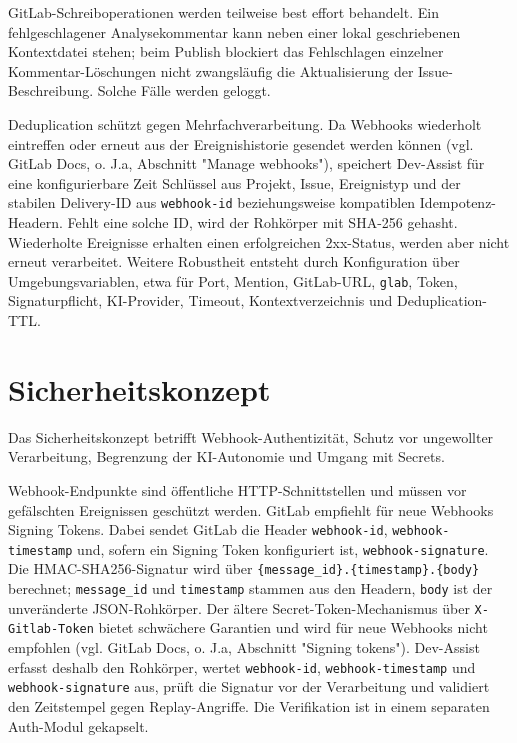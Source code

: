 \documentclass[12pt,a4paper,oneside]{scrreprt}
\begin{document}
GitLab-Schreiboperationen werden teilweise best effort behandelt. Ein fehlgeschlagener Analysekommentar kann neben einer lokal geschriebenen Kontextdatei stehen; beim Publish blockiert das Fehlschlagen einzelner Kommentar-Löschungen nicht zwangsläufig die Aktualisierung der Issue-Beschreibung. Solche Fälle werden geloggt.

Deduplication schützt gegen Mehrfachverarbeitung. Da Webhooks wiederholt eintreffen oder erneut aus der Ereignishistorie gesendet werden können (vgl. GitLab Docs, o. J.a, Abschnitt "Manage webhooks"), speichert Dev-Assist für eine konfigurierbare Zeit Schlüssel aus Projekt, Issue, Ereignistyp und der stabilen Delivery-ID aus \texttt{webhook-id} beziehungsweise kompatiblen Idempotenz-Headern. Fehlt eine solche ID, wird der Rohkörper mit SHA-256 gehasht. Wiederholte Ereignisse erhalten einen erfolgreichen 2xx-Status, werden aber nicht erneut verarbeitet. Weitere Robustheit entsteht durch Konfiguration über Umgebungsvariablen, etwa für Port, Mention, GitLab-URL, \texttt{glab}, Token, Signaturpflicht, KI-Provider, Timeout, Kontextverzeichnis und Deduplication-TTL.

\section{Sicherheitskonzept}

Das Sicherheitskonzept betrifft Webhook-Authentizität, Schutz vor ungewollter Verarbeitung, Begrenzung der KI-Autonomie und Umgang mit Secrets.

Webhook-Endpunkte sind öffentliche HTTP-Schnittstellen und müssen vor gefälschten Ereignissen geschützt werden. GitLab empfiehlt für neue Webhooks Signing Tokens. Dabei sendet GitLab die Header \texttt{webhook-id}, \texttt{webhook-timestamp} und, sofern ein Signing Token konfiguriert ist, \texttt{webhook-signature}. Die HMAC-SHA256-Signatur wird über \texttt{\{message\_id\}.\{timestamp\}.\{body\}} berechnet; \texttt{message\_id} und \texttt{timestamp} stammen aus den Headern, \texttt{body} ist der unveränderte JSON-Rohkörper. Der ältere Secret-Token-Mechanismus über \texttt{X-Gitlab-Token} bietet schwächere Garantien und wird für neue Webhooks nicht empfohlen (vgl. GitLab Docs, o. J.a, Abschnitt "Signing tokens"). Dev-Assist erfasst deshalb den Rohkörper, wertet \texttt{webhook-id}, \texttt{webhook-timestamp} und \texttt{webhook-signature} aus, prüft die Signatur vor der Verarbeitung und validiert den Zeitstempel gegen Replay-Angriffe. Die Verifikation ist in einem separaten Auth-Modul gekapselt.
\end{document}
